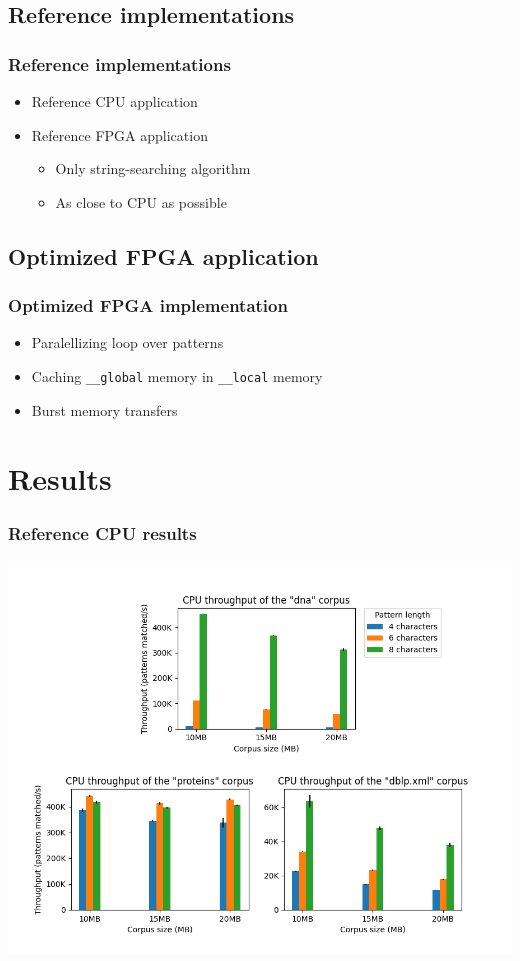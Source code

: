\documentclass[aspectratio=1610]{uva-inf-presentation}
\begin{document}
\subsection{Reference implementations}

\begin{frame}
  \frametitle{Reference implementations}
  \begin{itemize}
    \item Reference CPU application
    \item Reference FPGA application
      \begin{itemize}
        \item Only string-searching algorithm
        \item As close to CPU as possible
      \end{itemize}
  \end{itemize}
\end{frame}

\subsection{Optimized FPGA application}

\begin{frame}
  \frametitle{Optimized FPGA implementation}
  \begin{itemize}
    \item Paralellizing loop over patterns
    \item Caching \texttt{\_\_global} memory in \texttt{\_\_local} memory
    \item Burst memory transfers
  \end{itemize}
\end{frame}

\section{Results}

\begin{frame}
  \frametitle{Reference CPU results}
  \centering
  \includegraphics[width=0.67\linewidth]{throughput_cpu}
\end{frame}
\end{document}
